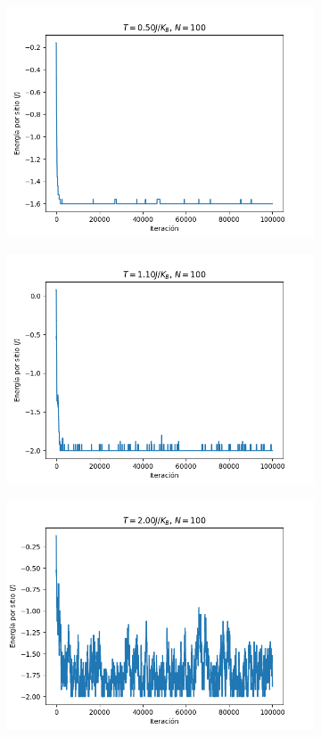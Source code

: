 \documentclass{article}
\begin{document}
\begin{figure}
\centering
\begin{subfigure}{0.49\textwidth}
\includegraphics[width=\textwidth]{energia_0.png}
\end{subfigure}
\begin{subfigure}{0.49\textwidth}
\includegraphics[width=\textwidth]{energia_200.png}
\end{subfigure}
\begin{subfigure}{0.49\textwidth}
\includegraphics[width=\textwidth]{energia_500.png}

\end{subfigure}
\end{figure}
\end{document}
